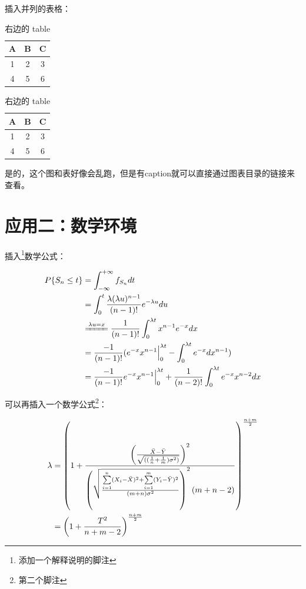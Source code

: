 \documentclass[a4paper,bachelor]{ructhesis}
\theoremstyle{definition}
\theoremstyle{definition}
\theoremstyle{definition}
\theoremstyle{remark}
\begin{document}
插入并列的表格：

\begin{table}
\begin{minipage}{0.5\textwidth}
  \centering
  \caption{\label{tab:t2}左边的 table}
  \begin{tabular}{c|c|c}
    \hline
    A & B & C \\
    \hline
    1 & 2 & 3  \\
    \hline
    4 & 5 & 6 \\
    \hline
  \end{tabular}
\end{minipage}
\begin{minipage}{0.5\textwidth}
  \centering
  \caption{\label{tab:t2}右边的 table}
  \begin{tabular}{c|c|c}
    \hline
    A & B & C \\
    \hline
    1 & 2 & 3  \\
    \hline
    4 & 5 & 6 \\
    \hline
  \end{tabular}
\end{minipage}
\end{table}

是的，这个图和表好像会乱跑，但是有caption就可以直接通过图表目录的链接来查看。

\section{应用二：数学环境}

插入\footnote{添加一个解释说明的脚注}数学公式：

\[
\begin{aligned}
P\{S_n \leq t\}
&= \int_{-\infty}^{+\infty}f_{S_n}dt \notag \\
&= \int_0^t\frac{\lambda(\lambda u)^{n-1}}{(n-1)!}e^{-\lambda u}du \\
&\xlongequal{\lambda u=x} \frac{1}{(n-1)!}\int_0^{\lambda t}x^{n-1}e^{-x}dx\\
&=\frac{-1}{(n-1)!}(e^{-x}x^{n-1}{\Big|}_0^{\lambda t}-\int_0^{\lambda t}e^{-x}dx^{n-1})\\
&=\frac{-1}{(n-1)!}e^{-x}x^{n-1}{\Big|}_0^{\lambda t}+\frac{1}{(n-2)!}\int_0^{\lambda t}e^{-x}x^{n-2}dx
\end{aligned}
\]

可以再插入一个数学公式\footnote{第二个脚注}：

\[    
\begin{aligned}
\lambda 
&=\left (1+\frac{\left(\frac{\bar{X}-\bar{Y}}{\sqrt{((\frac{1}{n}+\frac{1}{m})\sigma^2)}}\right)^2}{\left(\sqrt{\frac{\sum\limits_{i=1}^n(X_i-\bar{X})^2+\sum\limits_{i=1}^m(Y_i-\bar{Y})^2}{(m+n)\sigma^2}}\right)^2(m+n-2)}\right)^{\frac{n+m}{2}} \\ \notag
&=\left(1+\frac{T^2}{n+m-2}\right)^{\frac{n+m}{2}}
\end{aligned}
\]
\end{document}
